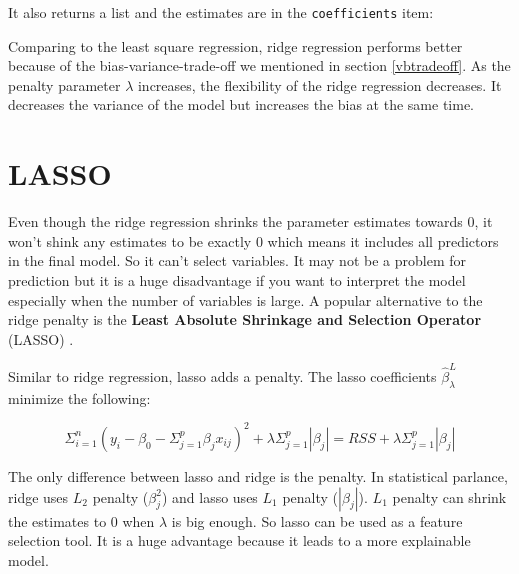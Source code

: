 \documentclass[12pt,]{krantz}
\makeatletter
\newenvironment{Shaded}{\begin{snugshade}}{\end{snugshade}}
\newcommand{\CommentTok}[1]{\textcolor[rgb]{0.37,0.37,0.37}{\textit{#1}}}
\newcommand{\NormalTok}[1]{#1}
\newcommand{\OperatorTok}[1]{\textcolor[rgb]{0.43,0.43,0.43}{\textbf{#1}}}
\newcommand{\StringTok}[1]{\textcolor[rgb]{0.5,0.5,0.5}{#1}}
\newenvironment{kframe}{%
\medskip{}
\setlength{\fboxsep}{.8em}
 \def\at@end@of@kframe{}%
 \ifinner\ifhmode%
  \def\at@end@of@kframe{\end{minipage}}%
  \begin{minipage}{\columnwidth}%
 \fi\fi%
 \def\FrameCommand##1{\hskip\@totalleftmargin \hskip-\fboxsep
 \colorbox{shadecolor}{##1}\hskip-\fboxsep
     \hskip-\linewidth \hskip-\@totalleftmargin \hskip\columnwidth}%
 \MakeFramed {\advance\hsize-\width
   \@totalleftmargin\z@ \linewidth\hsize
   \@setminipage}}%
 {\par\unskip\endMakeFramed%
 \at@end@of@kframe}
\renewenvironment{Shaded}{\begin{kframe}}{\end{kframe}}
\makeatother
\begin{document}
It also returns a list and the estimates are in the \texttt{coefficients} item:

\begin{Shaded}
\end{Shaded}

Comparing to the least square regression, ridge regression performs better because of the bias-variance-trade-off we mentioned in section \ref{vbtradeoff}. As the penalty parameter \(\lambda\) increases, the flexibility of the ridge regression decreases. It decreases the variance of the model but increases the bias at the same time.

\hypertarget{lasso}{%
\section{LASSO}\label{lasso}}

Even though the ridge regression shrinks the parameter estimates towards 0, it won't shink any estimates to be exactly 0 which means it includes all predictors in the final model. So it can't select variables. It may not be a problem for prediction but it is a huge disadvantage if you want to interpret the model especially when the number of variables is large. A popular alternative to the ridge penalty is the \textbf{Least Absolute Shrinkage and Selection Operator} (LASSO) \citep{Tibshirani1996}.

Similar to ridge regression, lasso adds a penalty. The lasso coefficients \(\hat{\beta}_{\lambda}^{L}\) minimize the following:

\begin{equation}
\Sigma_{i=1}^{n}(y_{i}-\beta_{0}-\Sigma_{j=1}^{p}\beta_{j}x_{ij})^{2}+\lambda\Sigma_{j=1}^{p}|\beta_{j}|=RSS+\lambda\Sigma_{j=1}^{p}|\beta_{j}|
\label{eq:lasso}
\end{equation}

The only difference between lasso and ridge is the penalty. In statistical parlance, ridge uses \(L_2\) penalty (\(\beta_{j}^{2}\)) and lasso uses \(L_1\) penalty (\(|\beta_{j}|\)). \(L_1\) penalty can shrink the estimates to 0 when \(\lambda\) is big enough. So lasso can be used as a feature selection tool. It is a huge advantage because it leads to a more explainable model.
\end{document}
